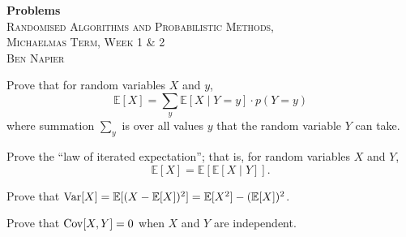 



\begin{center}
  \textbf{Problems} \\
  \textsc{Randomised Algorithms and Probabilistic Methods, \\ Michaelmas Term, Week 1 \& 2} \\
  \textsc{Ben Napier}
  \vspace{1em}
\end{center}

\begin{questions}
  \question Prove that for random variables $X$ and $y$, 
  \[ \mathbb E[X] = \sum_y \mathbb E[X \mid Y = y] \cdot p(Y = y) \] 
  where summation $\sum_y$ is over all values $y$ that the random variable $Y$ can take.

  \question Prove the ``law of iterated expectation''; that is, for random variables $X$ and $Y$,
  \[ \mathbb E[X] = \mathbb E[\mathbb E[X \mid Y]]. \] 

  \question Prove that $\operatorname*{Var}[X] = \mathbb E[(X - \mathbb E[X])^2] = \mathbb E[X^2] - (\mathbb E[X])^2$.

  \question Prove that $\operatorname*{Cov}[X,Y] = 0$ when $X$ and $Y$ are independent.
\end{questions}


